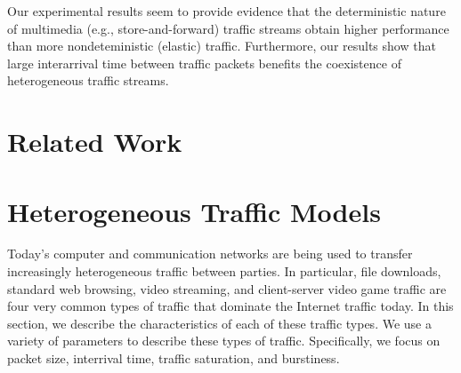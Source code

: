 \documentclass{llncs}
\begin{document}
Our experimental results seem to provide evidence that the deterministic nature of multimedia (e.g., store-and-forward) traffic streams obtain higher performance than more nondeteministic (elastic) traffic. Furthermore, our results show that large interarrival time between traffic packets benefits the coexistence of heterogeneous traffic streams. 

\section{Related Work}


\section{Heterogeneous Traffic Models}
Today's computer and communication networks are being used to transfer increasingly heterogeneous traffic between parties. In particular, file downloads, standard web browsing, video streaming, and client-server video game traffic are four very common types of traffic that dominate the Internet traffic today. In this section, we describe the characteristics of each of these traffic types. We use a variety of parameters to describe these types of traffic. Specifically, we focus on packet size, interrival time, traffic saturation, and burstiness. 
\end{document}
